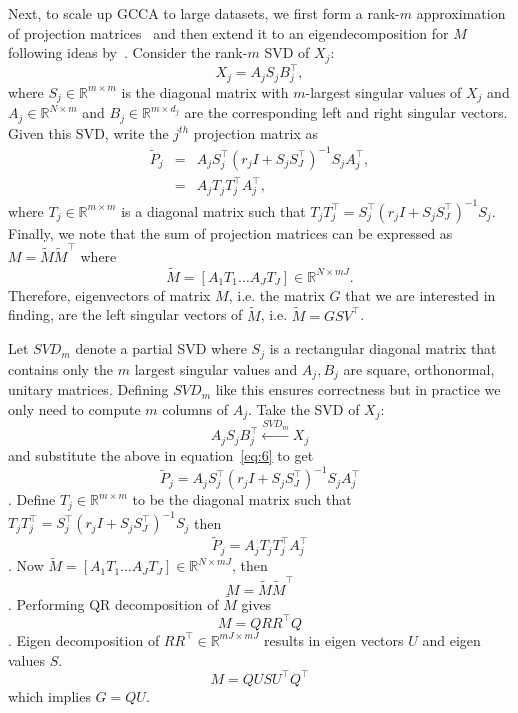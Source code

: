 \documentclass[11pt]{article}
\newcommand{\R}{\mathbb{R}}
\begin{document}
Next, to scale up GCCA to large datasets, we first form a rank-$m$ approximation of projection matrices~\cite{arora2012kernel} and then extend it to an eigendecomposition for $M$ following ideas by~. Consider the rank-$m$ SVD of $X_j$:
$$X_j = A_{j} S_{j} B^\top_{j},$$
where $S_j \in \R^{m \times m}$ is the diagonal matrix with $m$-largest singular values of $X_j$ and $A_j \in \R^{N \times m}$ and $B_j \in \R^{m \times d_j}$ are the corresponding left and right singular vectors. Given this SVD, write the $j^{th}$ projection matrix as 
\begin{eqnarray}
\widetilde{P}_j &=& A_j S_j^\top(r_j I + S_j S_J^\top)^{-1}S_j A_j^\top, \nonumber \\
&=& A_j T_j T_j^\top A_j^\top, \nonumber
\end{eqnarray}
where $T_j \in \mathbb{R}^{m \times m}$ is a diagonal matrix such that 
$T_jT_j^\top = S_j^\top(r_j I + S_j S_J^\top)^{-1}S_j$. Finally, we note that the sum of projection matrices can be expressed as $M = \tilde{M} \tilde{M}^\top$
where $$\tilde{M} = \left[ A_1T_1 \ldots A_JT_J \right] \in \mathbb{R}^{N
  \times mJ}.$$
Therefore, eigenvectors of matrix $M$, i.e. the matrix $G$ that we are interested in finding, are the left singular vectors of $\tilde{M}$, i.e. $\tilde{M}=GSV^\top$. 


Let $SVD_m$ denote a partial SVD where $S_j$ is a rectangular diagonal
matrix that contains only the $m$ largest singular values and $A_j, B_j$
are square, orthonormal, unitary matrices. Defining $SVD_m$ like this
ensures correctness but in practice we only need to compute $m$
columns of $A_j$. Take the SVD of $X_j$:
$$A_{j} S_{j} B^\top_{j} \xleftarrow{SVD_{m}} X_j$$
and substitute the above in equation~\ref{eq:6} to get 
$$\widetilde{P}_j = A_j S_j^\top(r_j I + S_j S_J^\top)^{-1}S_j A_j^\top$$. 
Define $T_j \in \mathbb{R}^{m \times m}$ to be the diagonal matrix such that
$T_jT_j^\top = S_j^\top(r_j I + S_j S_J^\top)^{-1}S_j $ then
$$\widetilde{P}_j = A_j T_j T_j^\top A_j^\top$$.
Now $\tilde{M} = \left[ A_1T_1 \ldots A_JT_J \right] \in \mathbb{R}^{N
  \times mJ}$, then 
$$M = \tilde{M} \tilde{M}^\top$$.
Performing QR decomposition of $\tilde{M}$ gives
$$M = Q R R^\top Q$$.
Eigen decomposition of $R R^\top \in \mathbb{R}^{mJ \times mJ}$
results in eigen vectors $U$ and eigen values $S$.
$$M = Q U S U^\top Q^\top$$
 which implies $G = QU$. 
\end{document}
